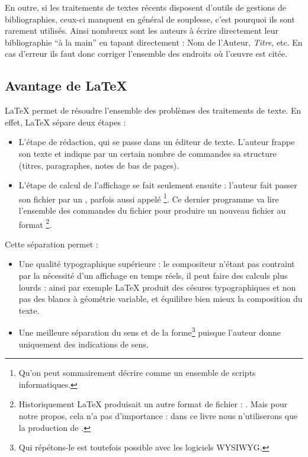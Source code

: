En outre, si les traitements de textes récents disposent d'outils de gestions de bibliographies, ceux-ci manquent en général de souplesse, c'est pourquoi ils sont rarement utilisés. Ainsi nombreux sont les auteurs à écrire directement leur bibliographie \enquote{à la main} en tapant directement : Nom de l'Auteur, \emph{Titre}, etc. En cas d'erreur ils faut donc corriger l'ensemble des endroits où l'œuvre est citée.

\subsection{Avantage de \LaTeX{}}

\LaTeX{} permet de résoudre l'ensemble des problèmes des traitements de texte. En effet, \LaTeX{} sépare deux étapes : 

\begin{itemize}
\item L'étape de rédaction, qui se passe dans un éditeur de texte. L'auteur frappe son texte et indique par un certain nombre de commandes sa structure (titres, paragraphes, notes de bas de pages).
\item L'étape de calcul de l'affichage se fait seulement ensuite : l'auteur fait passer son fichier par un , parfois aussi appelé \footnote{Qu'on peut sommairement décrire comme un ensemble de scripts informatiques.}. Ce dernier programme va lire l'ensemble des commandes du fichier pour produire un nouveau fichier au format \footnote{Historiquement \LaTeX{} produisait un autre format de fichier : . Mais pour notre propos, cela n'a pas d'importance : dans ce livre nous n'utiliserons que la production de .}.
\end{itemize}

Cette séparation permet :
\begin{itemize}
\item Une qualité typographique supérieure :  le compositeur n'étant pas contraint par la nécessité d'un affichage en temps réels, il peut faire des calculs plus lourds : ainsi par exemple \LaTeX{} produit des césures typographiques et non pas des blancs à géométrie variable, et équilibre bien mieux la composition du texte.
\item Une meilleure séparation du sens et de la forme\footnote{Qui répétons-le est toutefois possible avec les logiciels WYSIWYG.} puisque l'auteur donne uniquement des indications de sens.
\end{itemize}

